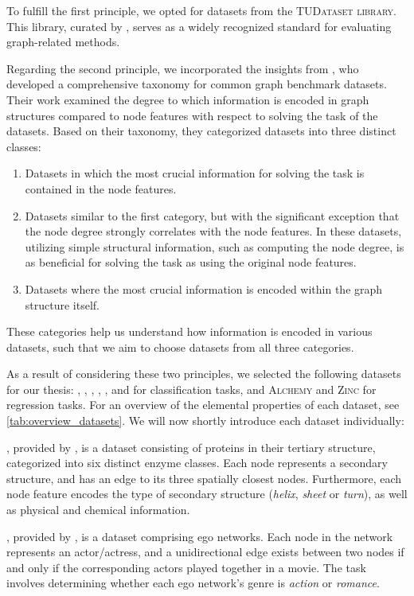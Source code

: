 To fulfill the first principle, we opted for datasets from the \textsc{TUDataset library}. This library, curated by \cite{Mor+2020}, serves as a widely recognized standard for evaluating graph-related methods.

Regarding the second principle, we incorporated the insights from \cite{Liu2022}, who developed a comprehensive taxonomy for common graph benchmark datasets. Their work examined the degree to which information is encoded in graph structures compared to node features with respect to solving the task of the datasets. Based on their taxonomy, they categorized datasets into three distinct classes:
\begin{enumerate}
	\item Datasets in which the most crucial information for solving the task is contained in the node features.
	\item Datasets similar to the first category, but with the significant exception that the node degree strongly correlates with the node features. In these datasets, utilizing simple structural information, such as computing the node degree, is as beneficial for solving the task as using the original node features.
	\item Datasets where the most crucial information is encoded within the graph structure itself.
\end{enumerate}
These categories help us understand how information is encoded in various datasets, such that we aim to choose datasets from all three categories.

As a result of considering these two principles, we selected the following datasets for our thesis: \enzymes, \imdb, \mutag, \nci, \proteins, and \reddit for classification tasks, and \textsc{Alchemy} and \textsc{Zinc} for regression tasks. For an overview of the elemental properties of each dataset, see \cref{tab:overview_datasets}. We will now shortly introduce each dataset individually: \newline

\enzymes, provided by \cite{Borgwardt2005}, is a dataset consisting of proteins in their tertiary structure, categorized into six distinct enzyme classes. Each node represents a secondary structure, and has an edge to its three spatially closest nodes. Furthermore, each node feature encodes the type of secondary structure (\textit{helix}, \textit{sheet} or \textit{turn}), as well as physical and chemical information. \newline


\imdb, provided by \cite{Yanardag2015}, is a dataset comprising ego networks. Each node in the network represents an actor/actress, and a unidirectional edge exists between two nodes if and only if the corresponding actors played together in a movie. The task involves determining whether each ego network's genre is \textit{action} or \textit{romance}. \newline

